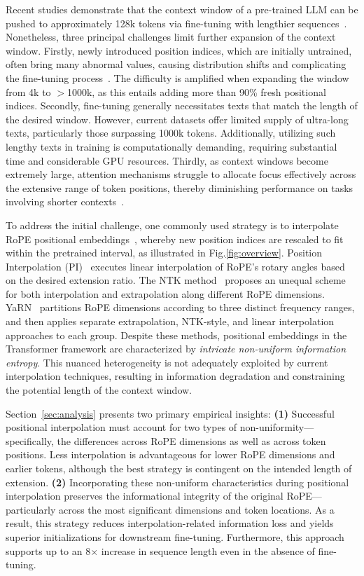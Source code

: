 Recent studies demonstrate that the context window of a pre-trained LLM can be pushed to approximately 128k tokens via fine-tuning with lengthier sequences~\cite{longlora,pi,yarn,zhang2024soaring,liu2023scaling}. Nonetheless, three principal challenges limit further expansion of the context window. Firstly, newly introduced position indices, which are initially untrained, often bring many abnormal values, causing distribution shifts and complicating the fine-tuning process~\cite{pi}. The difficulty is amplified when expanding the window from 4k to $>$1000k, as this entails adding more than 90\% fresh positional indices. Secondly, fine-tuning generally necessitates texts that match the length of the desired window. However, current datasets offer limited supply of ultra-long texts, particularly those surpassing 1000k tokens. Additionally, utilizing such lengthy texts in training is computationally demanding, requiring substantial time and considerable GPU resources. Thirdly, as context windows become extremely large, attention mechanisms struggle to allocate focus effectively across the extensive range of token positions, thereby diminishing performance on tasks involving shorter contexts~\cite{pi}.

To address the initial challenge, one commonly used strategy is to interpolate RoPE positional embeddings~\cite{rope,pi}, whereby new position indices are rescaled to fit within the pretrained interval, as illustrated in Fig.\ref{fig:overview}. Position Interpolation (PI)~\cite{pi} executes linear interpolation of RoPE's rotary angles based on the desired extension ratio. The NTK method~\cite{ntk,dynamicntk} proposes an unequal scheme for both interpolation and extrapolation along different RoPE dimensions. YaRN~\cite{yarn} partitions RoPE dimensions according to three distinct frequency ranges, and then applies separate extrapolation, NTK-style, and linear interpolation approaches to each group. Despite these methods, positional embeddings in the Transformer framework are characterized by \emph{intricate non-uniform information entropy}. This nuanced heterogeneity is not adequately exploited by current interpolation techniques, resulting in information degradation and constraining the potential length of the context window.

Section~\ref{sec:analysis} presents two primary empirical insights: \textbf{(1)} Successful positional interpolation must account for two types of non-uniformity—specifically, the differences across RoPE dimensions as well as across token positions. Less interpolation is advantageous for lower RoPE dimensions and earlier tokens, although the best strategy is contingent on the intended length of extension. \textbf{(2)} Incorporating these non-uniform characteristics during positional interpolation preserves the informational integrity of the original RoPE—particularly across the most significant dimensions and token locations. As a result, this strategy reduces interpolation-related information loss and yields superior initializations for downstream fine-tuning. Furthermore, this approach supports up to an 8$\times$ increase in sequence length even in the absence of fine-tuning.

